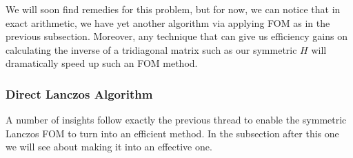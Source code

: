 \documentclass[11pt]{article}
\begin{document}

We will soon find remedies for this problem, but for now, we can notice that in exact arithmetic, we have yet another algorithm via applying FOM as in the previous subsection. Moreover, any technique that can give us efficiency gains on calculating the inverse of a tridiagonal matrix such as our symmetric $H$ will dramatically speed up such an FOM method.

\subsubsection{Direct Lanczos Algorithm}

A number of insights follow exactly the previous thread to enable the symmetric Lanczos FOM to turn into an efficient method. In the subsection after this one we will see about making it into an effective one.
\end{document}
